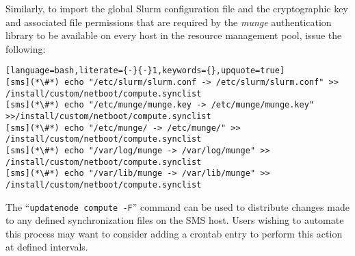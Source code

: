 \noindent Similarly, to import the global Slurm configuration file and the cryptographic
key and associated file permissions that are required by the {\em munge}
authentication library to be available on every host in the resource management
pool, issue the following:

\begin{lstlisting}[language=bash,literate={-}{-}1,keywords={},upquote=true]
[sms](*\#*) echo "/etc/slurm/slurm.conf -> /etc/slurm/slurm.conf" >> /install/custom/netboot/compute.synclist
[sms](*\#*) echo "/etc/munge/munge.key -> /etc/munge/munge.key" >>/install/custom/netboot/compute.synclist
[sms](*\#*) echo "/etc/munge/ -> /etc/munge/" >> /install/custom/netboot/compute.synclist
[sms](*\#*) echo "/var/log/munge -> /var/log/munge" >> /install/custom/netboot/compute.synclist
[sms](*\#*) echo "/var/lib/munge -> /var/lib/munge" >> /install/custom/netboot/compute.synclist
\end{lstlisting}

\begin{center}
\begin{tcolorbox}[]
\small
The ``\texttt{updatenode compute -F}'' command can be used to distribute changes made to any
defined synchronization files on the SMS host. Users wishing to automate this process may
want to consider adding a crontab entry to perform this action at defined intervals.
\end{tcolorbox}
\end{center}
